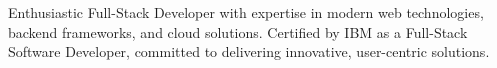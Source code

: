 

\begin{cvparagraph}

Enthusiastic Full-Stack Developer with expertise in modern web technologies, backend frameworks, and cloud solutions. Certified by IBM as a Full-Stack Software Developer, committed to delivering innovative, user-centric solutions.

\end{cvparagraph}
